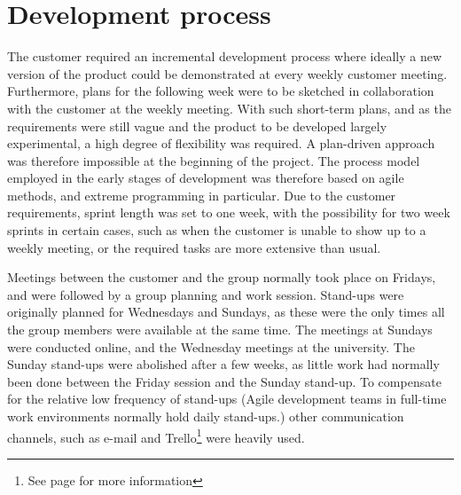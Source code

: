 \section{Development process}
\label{def:devProcess}
The customer required an incremental development process where ideally a new version of the product could be demonstrated at every weekly customer meeting. Furthermore, plans for the following week were to be sketched in collaboration with the customer at the weekly meeting. With such short-term plans, and as the requirements were still vague and the product to be developed largely experimental, a high degree of flexibility was required. A plan-driven approach was therefore impossible at the beginning of the project. The process model employed in the early stages of development was therefore based on agile methods, and extreme programming in particular. Due to the customer requirements, sprint length was set to one week, with the possibility for two week sprints in certain cases, such as when the customer is unable to show up to a weekly meeting, or the required tasks are more extensive than usual. 


Meetings between the customer and the group normally took place on Fridays, and were followed by a group planning and work session. Stand-ups were originally planned for Wednesdays and Sundays, as these were the only times all the group members were available at the same time. The meetings at Sundays were conducted online, and the Wednesday meetings at the university. The Sunday stand-ups were abolished after a few weeks, as little work had normally been done between the Friday session and the Sunday stand-up. To compensate for the relative low frequency of stand-ups (Agile development teams in full-time work environments normally hold daily stand-ups.) other communication channels, such as e-mail and Trello\footnote{See page \pageref{def:trello} for more information} were heavily used.

